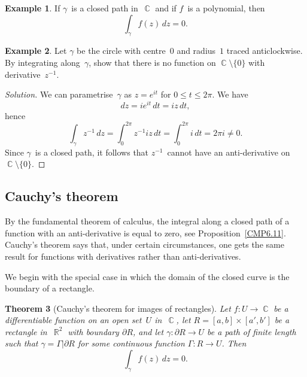 \documentclass{amsproc}
\newtheorem{theorem}{Theorem}[subsection]
\theoremstyle{definition}
\newtheorem{example}[theorem]{Example}
\newenvironment{solution}{\begin{proof}[Solution]}{\end{proof}}
\theoremstyle{remark}
\renewcommand{\d}{\partial}
\DeclareMathOperator{\R}{\mathbb{R}}
\DeclareMathOperator{\C}{\mathbb{C}}
\numberwithin{equation}{section}
\begin{document}
\begin{example} \label{CME6.12}
If $ \gamma $~is a closed
path in~$ \C $ and if $ f $~is a polynomial, then
$$
\int_\gamma f(z)\,dz=0.
$$
\end{example}

\begin{example} \label{CME6.13}
Let $ \gamma $ be the circle with centre~$ 0 $ and radius~$ 1 $ traced anticlockwise. By integrating along~$ \gamma $, show that there is no function on $ \C \setminus \{0\} $
with derivative~$ z^{-1} $.
\end{example}

\begin{solution}
We can parametrise~$ \gamma $ as $ z = e^{it} $ for $ 0 \leq t \leq 2\pi $. We have
$$
dz = ie^{it}\,dt = iz\,dt,
$$
hence
$$
\int_\gamma z^{-1}\,dz = \int_0^{2\pi} z^{-1}iz\,dt = \int_0^{2\pi} i\,dt = 2\pi i\neq 0.
$$
Since $ \gamma $~is a closed path, it follows that $ z^{-1} $~cannot have an anti-derivative on $ \C \setminus \{0\} $.
\end{solution}

\vfill\pagebreak


\subsection{Cauchy's theorem} \label{CMS7}

By the fundamental theorem of calculus, the integral along a closed path of a function with an anti-derivative is equal to zero, see Proposition~\ref{CMP6.11}.
Cauchy's theorem says that, under certain circumstances, one gets the same result for functions with derivatives rather than anti-derivatives.

We begin with the special case in which the domain of the closed curve is the boundary of a rectangle.

\begin{theorem}[Cauchy's theorem for images of rectangles] \label{CMT7.1}
Let $ f: U \to \C $ be a differentiable function on an open set~$ U $ in~$ \C $, let $ R = [a,b] \times [a',b'] $ be a rectangle in~$ \R^2 $ with boundary $ \d R $,
and let $ \gamma: \d R \to U $ be a path of finite length such that $ \gamma = \Gamma|\d R $ for some continuous function $ \Gamma: R \to U $. Then
$$
\int_\gamma f(z)\, dz = 0.
$$
\end{theorem}
\end{document}
